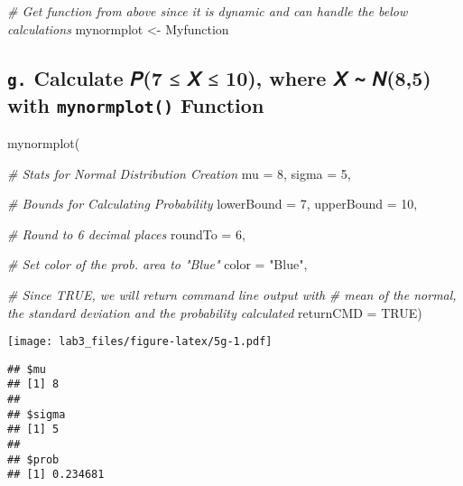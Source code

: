 \documentclass[
  12pt,
]{article}
\newenvironment{Shaded}{\begin{snugshade}}{\end{snugshade}}
\newcommand{\AttributeTok}[1]{\textcolor[rgb]{0.77,0.63,0.00}{#1}}
\newcommand{\CommentTok}[1]{\textcolor[rgb]{0.56,0.35,0.01}{\textit{#1}}}
\newcommand{\ConstantTok}[1]{\textcolor[rgb]{0.00,0.00,0.00}{#1}}
\newcommand{\DecValTok}[1]{\textcolor[rgb]{0.00,0.00,0.81}{#1}}
\newcommand{\FunctionTok}[1]{\textcolor[rgb]{0.00,0.00,0.00}{#1}}
\newcommand{\NormalTok}[1]{#1}
\newcommand{\OtherTok}[1]{\textcolor[rgb]{0.56,0.35,0.01}{#1}}
\newcommand{\StringTok}[1]{\textcolor[rgb]{0.31,0.60,0.02}{#1}}
\begin{document}
\begin{Shaded}
\begin{Highlighting}[]
\CommentTok{\# Get function from above since it is dynamic and can handle the below calculations}
\NormalTok{mynormplot }\OtherTok{\textless{}{-}}\NormalTok{ Myfunction}
\end{Highlighting}
\end{Shaded}

\hypertarget{g.-calculate-ux1d4437-ux1d44b-10-where-ux1d44b-ux1d44185-with-mynormplot-function}{%
\subsection{\texorpdfstring{\texttt{g.} Calculate 𝑃(7 ≤ 𝑋 ≤ 10), where 𝑋
∼ 𝑁(8,5) with \texttt{mynormplot()}
Function}{g. Calculate 𝑃(7 ≤ 𝑋 ≤ 10), where 𝑋 ∼ 𝑁(8,5) with mynormplot() Function}}\label{g.-calculate-ux1d4437-ux1d44b-10-where-ux1d44b-ux1d44185-with-mynormplot-function}}

\begin{Shaded}
\begin{Highlighting}[]
\FunctionTok{mynormplot}\NormalTok{(}
  
  \CommentTok{\# Stats for Normal Distribution Creation}
  \AttributeTok{mu =} \DecValTok{8}\NormalTok{, }
  \AttributeTok{sigma =} \DecValTok{5}\NormalTok{, }
  
  \CommentTok{\# Bounds for Calculating Probability}
  \AttributeTok{lowerBound =} \DecValTok{7}\NormalTok{, }
  \AttributeTok{upperBound =} \DecValTok{10}\NormalTok{, }
  
  \CommentTok{\# Round to 6 decimal places}
  \AttributeTok{roundTo =} \DecValTok{6}\NormalTok{, }
  
  \CommentTok{\# Set color of the prob. area to "Blue"}
  \AttributeTok{color =} \StringTok{"Blue"}\NormalTok{,}
  
  \CommentTok{\# Since TRUE, we will return command line output with}
  \CommentTok{\# mean of the normal, the standard deviation and the probability calculated}
  \AttributeTok{returnCMD =} \ConstantTok{TRUE}\NormalTok{) }
\end{Highlighting}
\end{Shaded}

\texttt{[image: lab3\_files/figure-latex/5g-1.pdf]}

\begin{verbatim}
## $mu
## [1] 8
## 
## $sigma
## [1] 5
## 
## $prob
## [1] 0.234681
\end{verbatim}
\end{document}
